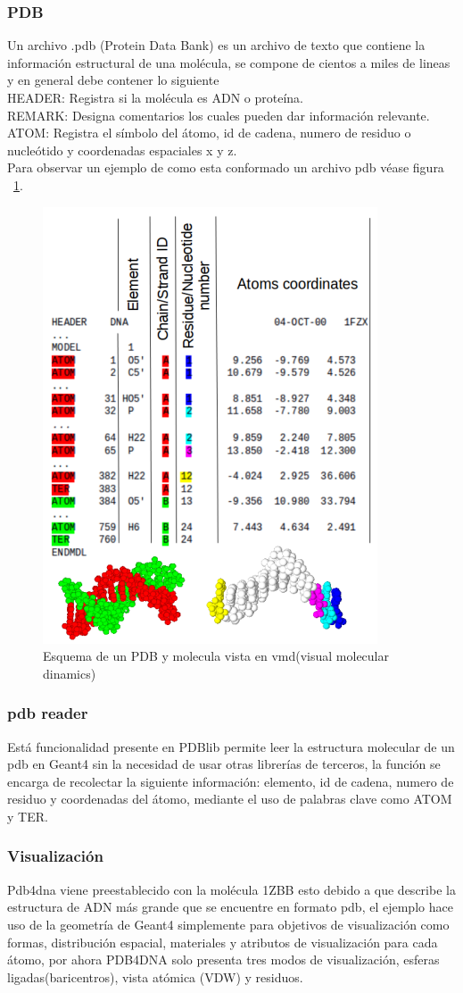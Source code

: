\subsubsection{PDB}
Un archivo .pdb (Protein Data Bank) es un archivo de texto que contiene la información estructural de una molécula, se compone de cientos a miles de lineas y en general debe contener lo siguiente\\
HEADER: Registra si la molécula es ADN o proteína.\\
REMARK: Designa comentarios los cuales pueden dar información relevante.\\
ATOM: Registra el símbolo del átomo, id de cadena, numero de residuo o nucleótido y coordenadas espaciales x y z. \\
Para observar un ejemplo de como esta conformado un archivo pdb véase figura ~\ref{fig:pdbesq}.
\begin{figure}[htbp]
    \centering
    \includegraphics[width=.5\linewidth]{./Figures/pdb.png}
    \caption[Esquema de un PDB]{Esquema de un PDB y molecula vista en vmd(visual molecular dinamics)}
    \label{fig:pdbesq}
\end{figure}

\subsubsection{pdb reader}
Está funcionalidad presente en PDBlib permite leer la estructura molecular de un pdb en Geant4 sin la necesidad de usar otras librerías de terceros, la función se encarga de recolectar la siguiente información: elemento, id de cadena, numero de residuo y coordenadas del átomo, mediante el uso de palabras clave como ATOM y TER\cite{pdblib}.
\subsubsection{Visualización}
Pdb4dna viene preestablecido con la molécula 1ZBB esto debido a que describe la estructura de ADN más grande que se encuentre en formato pdb, el ejemplo hace uso de la geometría de Geant4 simplemente para objetivos de visualización como formas, distribución espacial, materiales y atributos de visualización para cada átomo, por ahora PDB4DNA solo presenta tres modos de visualización, esferas ligadas(baricentros), vista atómica (VDW) y residuos\cite{pdblib}.

